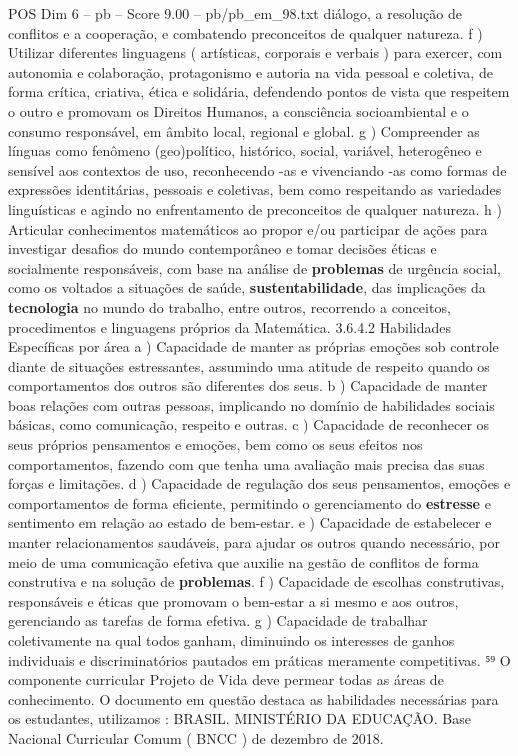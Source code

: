 \begin{textsample}{POS Dim 6 – pb – Score 9.00 – pb/pb\_em\_98.txt}
diálogo, a resolução de conflitos e a cooperação, e combatendo preconceitos de qualquer natureza. f ) Utilizar diferentes linguagens ( artísticas, corporais e verbais ) para exercer, com autonomia e colaboração, protagonismo e autoria na vida pessoal e coletiva, de forma crítica, criativa, ética e solidária, defendendo pontos de vista que respeitem o outro e promovam os Direitos Humanos, a consciência socioambiental e o consumo responsável, em âmbito local, regional e global. g ) Compreender as línguas como fenômeno (geo)político, histórico, social, variável, heterogêneo e sensível aos contextos de uso, reconhecendo -as e vivenciando -as como formas de expressões identitárias, pessoais e coletivas, bem como respeitando as variedades linguísticas e agindo no enfrentamento de preconceitos de qualquer natureza. h ) Articular conhecimentos matemáticos ao propor e/ou participar de ações para investigar desafios do mundo contemporâneo e tomar decisões éticas e socialmente responsáveis, com base na análise de \textbf{problemas} de urgência social, como os voltados a situações de saúde, \textbf{sustentabilidade}, das implicações da \textbf{tecnologia} no mundo do trabalho, entre outros, recorrendo a conceitos, procedimentos e linguagens próprios da Matemática. 3.6.4.2 Habilidades Específicas por área a ) Capacidade de manter as próprias emoções sob controle diante de situações estressantes, assumindo uma atitude de respeito quando os comportamentos dos outros são diferentes dos seus. b ) Capacidade de manter boas relações com outras pessoas, implicando no domínio de habilidades sociais básicas, como comunicação, respeito e outras. c ) Capacidade de reconhecer os seus próprios pensamentos e emoções, bem como os seus efeitos nos comportamentos, fazendo com que tenha uma avaliação mais precisa das suas forças e limitações. d ) Capacidade de regulação dos seus pensamentos, emoções e comportamentos de forma eficiente, permitindo o gerenciamento do \textbf{estresse} e sentimento em relação ao estado de bem-estar. e ) Capacidade de estabelecer e manter relacionamentos saudáveis, para ajudar os outros quando necessário, por meio de uma comunicação efetiva que auxilie na gestão de conflitos de forma construtiva e na solução de \textbf{problemas}. f ) Capacidade de escolhas construtivas, responsáveis e éticas que promovam o bem-estar a si mesmo e aos outros, gerenciando as tarefas de forma efetiva. g ) Capacidade de trabalhar coletivamente na qual todos ganham, diminuindo os interesses de ganhos individuais e discriminatórios pautados em práticas meramente competitivas. ⁵⁹ O componente curricular Projeto de Vida deve permear todas as áreas de conhecimento.
O documento em questão destaca as habilidades necessárias para os estudantes, utilizamos : BRASIL.
MINISTÉRIO DA EDUCAÇÃO.
Base Nacional Curricular Comum ( BNCC ) de dezembro de 2018.

\end{textsample}
